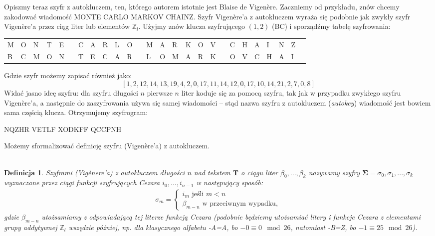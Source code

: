 \documentclass[a4paper]{article}
\theoremstyle{defn}
\newtheorem{defn}{Definicja}[subsection]
\theoremstyle{theorem}
\theoremstyle{lemma}
\theoremstyle{cor}
\theoremstyle{fact}
\begin{document}
Opiszmy teraz szyfr z autokluczem, ten, którego autorem istotnie jest Blaise de Vigenère. Zaczniemy od przykładu, znów chcemy zakodować wiadomość MONTE CARLO MARKOV CHAINZ. Szyfr Vigenère'a z autokluczem wyraża się podobnie jak zwykły szyfr Vigenère'a przez ciąg liter lub elementów $\mathbb{Z}_l$. Użyjmy znów klucza szyfrującego $(1, 2)$ (BC) i sporządźmy tabelę szyfrowania:
\begin{center}\begin{tabular}{|p{1.5mm}|p{1.5mm}|p{1.5mm}|p{1.5mm}|p{1.5mm}|p{1.5mm}|p{1.5mm}|p{1.5mm}|p{1.5mm}|p{1.5mm}|p{1.5mm}|p{1.5mm}|p{1.5mm}|p{1.5mm}|p{1.5mm}|p{1.5mm}|p{1.5mm}|p{1.5mm}|p{1.5mm}|p{1.5mm}|p{1.5mm}|p{1.5mm}|p{1.5mm}|p{1.5mm}|p{1.5mm}|p{1.5mm}|}
    M & O & N & T & E & & C & A & R & L & O & & M & A & R & K & O & V & & C & H & A & I & N & Z \\
    B & C & M & O & N & & T & E & C & A & R & & L & O & M & A & R & K & & O & V & C & H & A & I
\end{tabular}
\end{center}
Gdzie szyfr możemy zapisać również jako:
$$[1, 2, 12, 14, 13, 19, 4, 2, 0, 17, 11, 14, 12, 0, 17, 10, 14, 21, 2, 7, 0, 8]$$
Widać jasno ideę szyfru: dla szyfru długości $n$ pierwsze $n$ liter koduje się za pomocą szyfru, tak jak w przypadku zwykłego szyfru Vigenère'a, a następnie do zaszyfrowania używa się samej wiadomości – stąd nazwa szyfru z autokluczem (\textit{autokey}) wiadomość jest bowiem sama częścią klucza. Otrzymujemy szyfrogram:\\
\begin{center}
    NQZHR VETLF XODKFF QCCPNH
\end{center}
Możemy sformalizować definicję szyfru (Vigenère'a) z autokluczem. \\\\
\begin{defn}\label{defn4.2.2}
\textit{Szyframi (Vigènere'a) z autokluczem} długości $n$ nad tekstem $\boldsymbol{T}$ o ciągu liter $\beta_0, ..., \beta_k$ nazywamy szyfry $\boldsymbol{\Sigma} = \sigma_0, \sigma_1, ..., \sigma_k$ wyznaczane przez ciągi funkcji szyfrujących Cezara $i_0, ..., i_{n-1}$ w następujący sposób:
\begin{align*}
\sigma_m =
\begin{cases}
  i_m \text{ jeśli } m < n  \\
  \beta_{m-n} \text{ w przeciwnym wypadku},
\end{cases}
\end{align*}
gdzie $\beta_{m-n}$ utożsamiamy z odpowiadającą tej literze funkcją Cezara (podobnie będziemy utożsamiać litery i funkcje Cezara z elementami grupy addytywnej $\mathbb{Z}_l$ wszędzie później, np. dla klasycznego alfabetu -A=A, bo $-0 \equiv 0 \mod 26$, natomiast -B=Z, bo $-1 \equiv 25 \mod 26$).
\end{defn}\
\end{document}
